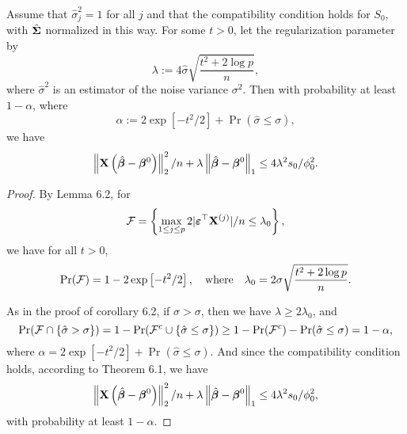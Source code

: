 \begin{corollary}
	Assume that $\hat{\sigma}_j^{2}=1$ for all $j$ and that the compatibility condition holds for $S_{0}$, with $\hat{\boldsymbol{\Sigma}}$ normalized in this way. For some $t>0$, let the regularization parameter by
	\begin{equation*}
		\lambda:=4\hat{\sigma}\sqrt{\frac{t^{2}+2\log p}{n}},
	\end{equation*}
	where $\hat{\sigma}^{2}$ is an estimator of the noise variance $\sigma^{2}$. Then with probability at least $1-\alpha$, where
	\begin{equation*}
		\alpha:=2\exp\left[-t^{2}/2\right]+\Pr(\hat{\sigma}\leq\sigma),
	\end{equation*}
	we have
	\begin{equation*}
		\left\|{\bf X}\left(\hat{\boldsymbol{\beta}}-\boldsymbol{\beta}^{0}\right)\right\|_{2}^{2}/n+\lambda\left\|\hat{\boldsymbol{\beta}}-\boldsymbol{\beta}^{0}\right\|_{1}\leq 4 \lambda^{2}s_{0}/\phi_{0}^{2}.
	\end{equation*}
\end{corollary}

\begin{proof}
	By Lemma 6.2, for
	\begin{equation*}
		{\mathcal F}=\left\{\max_{1\leq j\leq p}2|\boldsymbol{\varepsilon}^{\top}{\bf X}^{(j)}|/n\leq\lambda_{0}\right\},
	\end{equation*}
	we have for all $t>0$,
	\begin{equation*}
		\Pr({\mathcal F})=1-2\exp\left[-t^{2}/2\right],\quad\text{where}\quad\lambda_{0}=2\sigma\sqrt{\frac{t^{2}+2\log p}{n}}.
	\end{equation*}

	As in the proof of corollary 6.2, if $\hat{\sigma}>\sigma$, then we have $\lambda\geq 2\lambda_{0}$, and
	\begin{equation*}
		\Pr({\mathcal F}\cap\{\hat{\sigma}>\sigma\})=1-\Pr({\mathcal F}^{c}\cup\{\hat{\sigma}\leq\sigma\})\geq 1-\Pr({\mathcal F}^{c})-\Pr(\hat{\sigma}\leq\sigma)=1-\alpha,
	\end{equation*}
	where $\alpha=2\exp\left[-t^{2}/2\right]+\Pr(\hat{\sigma}\leq\sigma)$. And since the compatibility condition holds, according to Theorem 6.1, we have
	\begin{equation*}
		\left\|{\bf X}\left(\hat{\boldsymbol{\beta}}-\boldsymbol{\beta}^{0}\right)\right\|_{2}^{2}/n+\lambda\left\|\hat{\boldsymbol{\beta}}-\boldsymbol{\beta}^{0}\right\|_{1}\leq 4 \lambda^{2}s_{0}/\phi_{0}^{2},
	\end{equation*}
	with probability at least $1-\alpha$.
\end{proof}

